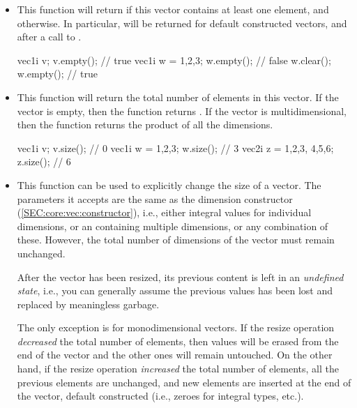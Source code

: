 \documentclass[12pt,a4paper]{report}
\newenvironment{example}
{
    \begin{mdframed}[style=example,frametitle={Example}]
}
{
    \end{mdframed}
}
\newcommand{\cpptrue}{\cppinline{true}\xspace}
\newcommand{\cppfalse}{\cppinline{false}\xspace}
\begin{document}
\begin{itemize}
\item {}

This function will return \cpptrue if this vector contains at least one element, and \cppfalse otherwise. In particular, \cpptrue will be returned for default constructed vectors, and after a call to .

\begin{example}
\begin{cppcode}
vec1i v;
v.empty(); // true
vec1i w = {1,2,3};
w.empty(); // false
w.clear();
w.empty(); // true
\end{cppcode}
\end{example}

\item {}

This function will return the total number of elements in this vector. If the vector is empty, then the function returns . If the vector is multidimensional, then the function returns the product of all the dimensions.

\begin{example}
\begin{cppcode}
vec1i v;
v.size(); // 0
vec1i w = {1,2,3};
w.size(); // 3
vec2i z = {{1,2,3}, {4,5,6}};
z.size(); // 6
\end{cppcode}
\end{example}

\item {}

This function can be used to explicitly change the size of a vector. The parameters it accepts are the same as the dimension constructor (\ref{SEC:core:vec:constructor}), i.e., either integral values for individual dimensions, or an  containing multiple dimensions, or any combination of these. However, the total number of dimensions of the vector must remain unchanged.

After the vector has been resized, its previous content is left in an \emph{undefined state}, i.e., you can generally assume the previous values has been lost and replaced by meaningless garbage.

The only exception is for monodimensional vectors. If the resize operation \emph{decreased} the total number of elements, then values will be erased from the end of the vector and the other ones will remain untouched. On the other hand, if the resize operation \emph{increased} the total number of elements, all the previous elements are unchanged, and new elements are inserted at the end of the vector, default constructed (i.e., zeroes for integral types, etc.).


\end{itemize}
\end{document}

